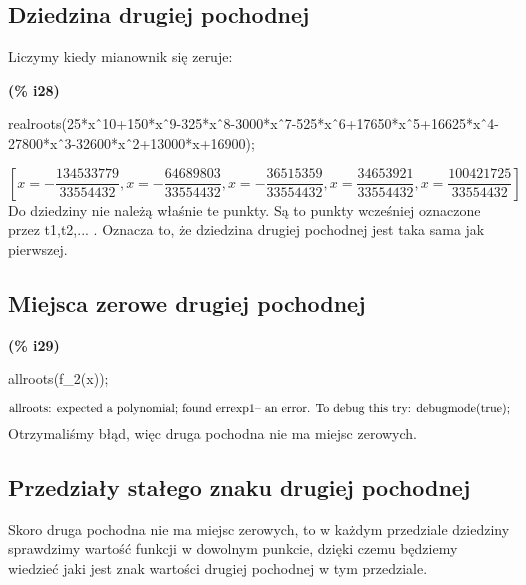 \documentclass[a4paper]{article}
\begin{document}
\subsection{Dziedzina drugiej pochodnej}
Liczymy kiedy mianownik się zeruje:


\noindent
\begin{minipage}[t]{4.000000em}\color{red}\bfseries
(\% i28)	
\end{minipage}
\begin{minipage}[t]{\textwidth}\color{blue}
realroots(25*x\^\ 10+150*x\^\ 9-325*x\^\ 8-3000*x\^\ 7-525*x\^\ 6+17650*x\^\ 5+16625*x\^\ 4-27800*x\^\ 3-32600*x\^\ 2+13000*x+16900);
\end{minipage}
\[\displaystyle \tag{\% o28} 
\operatorname{[}x=-\frac{134533779}{33554432}\operatorname{,}x=-\frac{64689803}{33554432}\operatorname{,}x=-
\frac{36515359}{33554432}\operatorname{,}x=\frac{34653921}{33554432}\operatorname{,}x=\frac{100421725}{33554432}\operatorname{]}\mbox{}
\]
Do dziedziny nie należą właśnie te punkty. Są to punkty wcześniej oznaczone przez t1,t2,... . Oznacza to, że dziedzina drugiej pochodnej jest taka sama jak pierwszej.
\subsection{Miejsca zerowe drugiej pochodnej}

\noindent
\begin{minipage}[t]{4.000000em}\color{red}\bfseries
(\% i29)	
\end{minipage}
\begin{minipage}[t]{\textwidth}\color{blue}
allroots(f\_2(x));
\end{minipage}
\[\displaystyle \mbox{}\\\mbox{%
allroots: expected a polynomial; found }\ensuremath{\mathrm{errexp1
}}\mbox{%
 -- an error. To debug this try: debugmode(true);}\mbox{}
\]
Otrzymaliśmy błąd, więc druga pochodna nie ma miejsc zerowych. 
\subsection{Przedziały stałego znaku drugiej pochodnej}

Skoro druga pochodna nie ma miejsc zerowych, to w każdym przedziale dziedziny sprawdzimy wartość funkcji w dowolnym punkcie, dzięki czemu będziemy wiedzieć jaki jest znak wartości drugiej pochodnej w tym przedziale.
\end{document}
